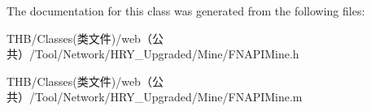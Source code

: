 The documentation for this class was generated from the following files\+:\begin{DoxyCompactItemize}
\item 
T\+H\+B/\+Classes(类文件)/web（公共）/\+Tool/\+Network/\+H\+R\+Y\+\_\+\+Upgraded/\+Mine/F\+N\+A\+P\+I\+Mine.\+h\item 
T\+H\+B/\+Classes(类文件)/web（公共）/\+Tool/\+Network/\+H\+R\+Y\+\_\+\+Upgraded/\+Mine/F\+N\+A\+P\+I\+Mine.\+m\end{DoxyCompactItemize}
